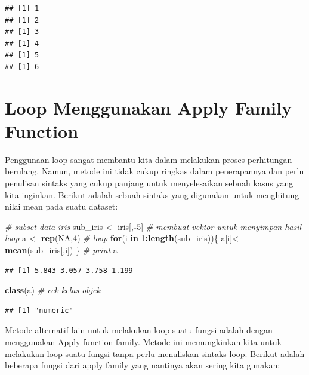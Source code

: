 \documentclass[]{book}
\newenvironment{Shaded}{\begin{snugshade}}{\end{snugshade}}
\newcommand{\KeywordTok}[1]{\textcolor[rgb]{0.13,0.29,0.53}{\textbf{#1}}}
\newcommand{\DecValTok}[1]{\textcolor[rgb]{0.00,0.00,0.81}{#1}}
\newcommand{\StringTok}[1]{\textcolor[rgb]{0.31,0.60,0.02}{#1}}
\newcommand{\CommentTok}[1]{\textcolor[rgb]{0.56,0.35,0.01}{\textit{#1}}}
\newcommand{\OtherTok}[1]{\textcolor[rgb]{0.56,0.35,0.01}{#1}}
\newcommand{\ControlFlowTok}[1]{\textcolor[rgb]{0.13,0.29,0.53}{\textbf{#1}}}
\newcommand{\OperatorTok}[1]{\textcolor[rgb]{0.81,0.36,0.00}{\textbf{#1}}}
\newcommand{\NormalTok}[1]{#1}
\begin{document}
\begin{verbatim}
## [1] 1
## [1] 2
## [1] 3
## [1] 4
## [1] 5
## [1] 6
\end{verbatim}

\section{Loop Menggunakan Apply Family
Function}\label{loop-menggunakan-apply-family-function}

Penggunaan loop sangat membantu kita dalam melakukan proses perhitungan
berulang. Namun, metode ini tidak cukup ringkas dalam penerapannya dan
perlu penulisan sintaks yang cukup panjang untuk menyelesaikan sebuah
kasus yang kita inginkan. Berikut adalah sebuah sintaks yang digunakan
untuk menghitung nilai mean pada suatu dataset:

\begin{Shaded}
\begin{Highlighting}[]
\CommentTok{# subset data iris}
\NormalTok{sub_iris <-}\StringTok{ }\NormalTok{iris[,}\OperatorTok{-}\DecValTok{5}\NormalTok{]}
\CommentTok{# membuat vektor untuk menyimpan hasil loop}
\NormalTok{a <-}\StringTok{ }\KeywordTok{rep}\NormalTok{(}\OtherTok{NA}\NormalTok{,}\DecValTok{4}\NormalTok{)}
\CommentTok{# loop}
\ControlFlowTok{for}\NormalTok{(i }\ControlFlowTok{in} \DecValTok{1}\OperatorTok{:}\KeywordTok{length}\NormalTok{(sub_iris))\{}
\NormalTok{  a[i]<-}\KeywordTok{mean}\NormalTok{(sub_iris[,i])}
\NormalTok{\}}
\CommentTok{# print}
\NormalTok{a}
\end{Highlighting}
\end{Shaded}

\begin{verbatim}
## [1] 5.843 3.057 3.758 1.199
\end{verbatim}

\begin{Shaded}
\begin{Highlighting}[]
\KeywordTok{class}\NormalTok{(a) }\CommentTok{# cek kelas objek}
\end{Highlighting}
\end{Shaded}

\begin{verbatim}
## [1] "numeric"
\end{verbatim}

Metode alternatif lain untuk melakukan loop suatu fungsi adalah dengan
menggunakan Apply function family. Metode ini memungkinkan kita untuk
melakukan loop suatu fungsi tanpa perlu menuliskan sintaks loop. Berikut
adalah beberapa fungsi dari apply family yang nantinya akan sering kita
gunakan:
\end{document}
